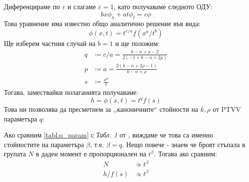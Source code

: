 Диференцираме по $\varepsilon$ и слагаме $\varepsilon = 1$, като получаваме следното ОДУ:
\begin{equation*}
    b x{\phi _x} + a t{\phi _t} = c \phi
\end{equation*}
Това уравнение има известно общо аналитично решение във вида:
\begin{equation*}
    \phi(x, t) = t^{c/a} f \left(x^a / t^b \right)
\end{equation*}
Ще изберем частния случай на $b = 1$ и ще положим:
\begin{align*}
    q & \coloneqq c/a = \frac{{k - n + \rho  - 2}}{{2\left( { - 1 + k - n + 2\rho } \right)}} \\
    p & \coloneqq a= \frac{{2\left( {k - n + 2\rho  - 1} \right)}}{{k - n + \rho }} \\
    s & \coloneqq \frac{x^p}{t}
\end{align*}
Тогава, замествайки полаганията получаваме:
\begin{equation*}
    h = \phi(x, t) = t^q f(s)
\end{equation*}
Това ни позволява да пресметнем за ,,каноничните`` стойности на $k, \rho$ от PTVV \cite{Kozlov2022} параметъра $q$:
\begin{table}[hbpt]
\centering
\caption{Стойности на $q$ за различни стойности на $k, \rho$}
\label{tabl:q_param}
\end{table}
Ако сравним \autoref{tabl:q_param} с \textit{Табл. 1} от \cite{Kozlov2022}, виждаме че това са именно стойностите на параметъра $\beta$, т.е. $\beta = q$. Нещо повече - знаем че броят стъпала в групата $N$ в даден момент е пропорционален на $t^\beta$. Тогава ако сравним:
\begin{align*}
    N      & \propto t^\beta \\
    h/f(s) & \propto t^\beta 
\end{align*}
